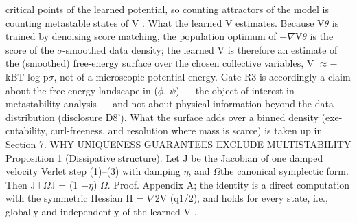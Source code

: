 \documentclass{article}
\begin{document}
critical points of the learned potential, so counting attractors of the model is counting metastable
states of V .
What the learned V estimates.
Because V$\theta$ is trained by denoising score matching, the population
optimum of $-$$\nabla$V$\theta$ is the score of the $\sigma$-smoothed data density; the learned V is therefore an estimate
of the (smoothed) free-energy surface over the chosen collective variables, V $\approx$$-$kBT log p$\sigma$, not
of a microscopic potential energy. Gate R3 is accordingly a claim about the free-energy landscape
in ($\phi$, $\psi$) --- the object of interest in metastability analysis --- and not about physical information
beyond the data distribution (disclosure D8'). What the surface adds over a binned density (exe-
cutability, curl-freeness, and resolution where mass is scarce) is taken up in Section 7.
WHY UNIQUENESS GUARANTEES EXCLUDE MULTISTABILITY
Proposition 1 (Dissipative structure). Let J be the Jacobian of one damped velocity Verlet step
(1)--(3) with damping $\eta$, and $\Omega$the canonical symplectic form. Then J$\top$$\Omega$J = (1 $-$$\eta$) $\Omega$.
Proof. Appendix A; the identity is a direct computation with the symmetric Hessian H
=
$\nabla$2V (q1/2), and holds for every state, i.e., globally and independently of the learned V .
\clearpage

\end{document}
